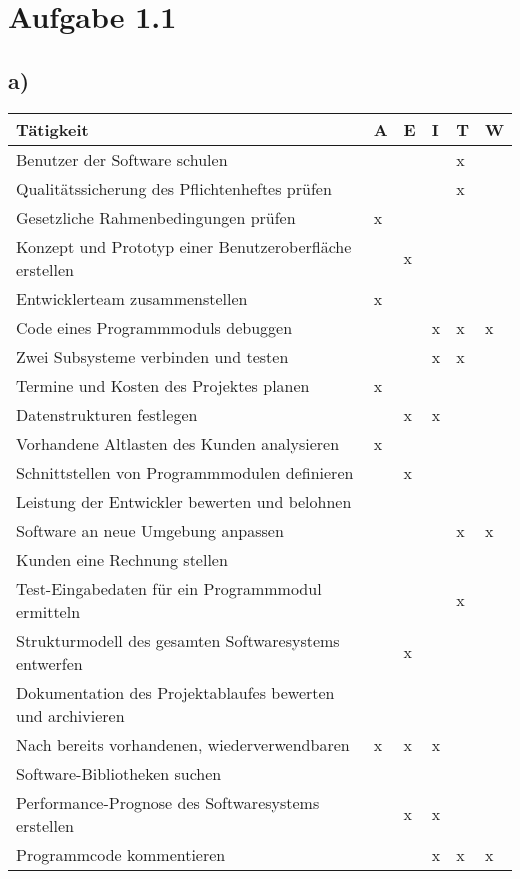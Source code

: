 \documentclass[a4paper,11pt]{scrartcl}
\begin{document}
		
	\section*{Aufgabe 1.1}
	\subsection*{a)}
	\begin{table}[h!]
		\begin{tabular}{l|l|l|l|l|l}
		 \textbf{Tätigkeit} 										&A &E &I &T &W \\ 
		 \hline
		 Benutzer der Software schulen								&  &  &  &x &  \\
		 Qualitätssicherung des Pflichtenheftes prüfen				&  &  &  &x &  \\
		 Gesetzliche Rahmenbedingungen prüfen						&x &  &  &  &  \\
		 Konzept und Prototyp einer Benutzeroberfläche erstellen	&  &x &  &  &  \\
		 Entwicklerteam zusammenstellen								&x &  &  &  &  \\
		 Code eines Programmmoduls debuggen							&  &  &x &x &x \\
 		 Zwei Subsysteme verbinden und testen						&  &  &x &x &  \\
 		 Termine und Kosten des Projektes planen					&x &  &  &  &  \\
		 Datenstrukturen festlegen									&  &x &x &  &  \\
		 Vorhandene Altlasten des Kunden analysieren				&x &  &  &  &  \\
		 Schnittstellen von Programmmodulen definieren				&  &x &  &  &  \\
		 Leistung der Entwickler bewerten und belohnen				&  &  &  &  &  \\
		 Software an neue Umgebung anpassen							&  &  &  &x &x \\
		 Kunden eine Rechnung stellen								&  &  &  &  &  \\
		 Test-Eingabedaten für ein Programmmodul ermitteln			&  &  &  &x &  \\ 
		 Strukturmodell des gesamten Softwaresystems entwerfen		&  &x &  &  &  \\ 
		 Dokumentation des Projektablaufes bewerten und archivieren	&  &  &  &  &  \\ 
		 Nach bereits vorhandenen, wiederverwendbaren 				&x &x &x &  &  \\ 
		 	     Software-Bibliotheken suchen	&  &  &  &  &  \\ 	
		 Performance-Prognose des Softwaresystems erstellen			&  &x &x &  &  \\ 
		 Programmcode kommentieren									&  &  &x &x &x \\ 
		\end{tabular}
	\end{table}
\end{document}
